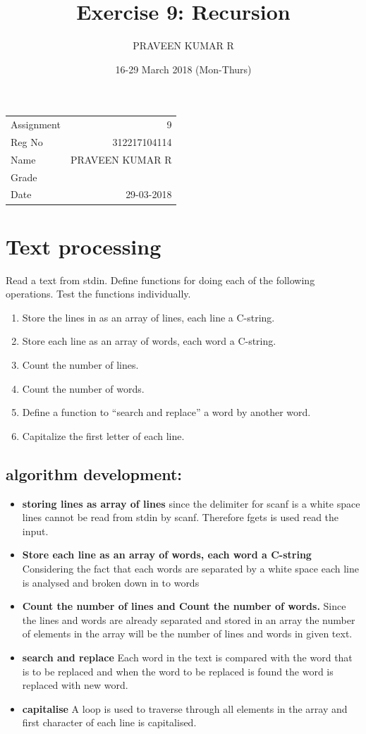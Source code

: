 \documentclass[11pt]{article}
\author{PRAVEEN KUMAR R}
\date{16-29 March 2018 (Mon-Thurs)}
\title{Exercise 9: Recursion}
\begin{document}
\maketitle
\linespread{1.2}
\begin{center}
\begin{tabular}{lr}
Assignment & 9\\
Reg No & 312217104114\\
Name & PRAVEEN KUMAR R\\
Grade & \\
Date & 29-03-2018\\
\end{tabular}
\end{center}
\linespread{1.5}

\section{Text processing}
\label{sec-1}
Read a text from stdin. Define functions for doing each of
the following operations. Test the functions individually.
\begin{enumerate}
\item Store the lines in as an array of lines, each line a C-string.
\item Store each line as an array of words, each word a C-string.
\item Count the number of lines.
\item Count the number of words.
\item Define a function to ``search and replace'' a word by another word.
\item Capitalize the first letter of each line.
\end{enumerate}

\subsection*{algorithm development:}
\label{sec-1-1}
\begin{itemize}
\item \textbf{storing lines as array of lines}
since the delimiter for scanf is a white space lines cannot be
read from stdin by scanf. Therefore fgets is used read the input.
\item \textbf{Store each line as an array of words, each word a C-string}
Considering the fact that each words are separated by a white space
each line is analysed and broken down in to words
\item \textbf{Count the number of lines and Count the number of words.}
Since the lines and words are already separated and stored in an array 
the number of elements  in the array will be the number of lines and words
in given text.
\item \textbf{search and replace}
Each word in the text is compared with the word that is to be replaced and 
when the word to be replaced is found the word is replaced with new word.
\item \textbf{capitalise}
A loop is used to traverse through all elements in the array and
first character of each line is capitalised.
\end{itemize}
\end{document}

